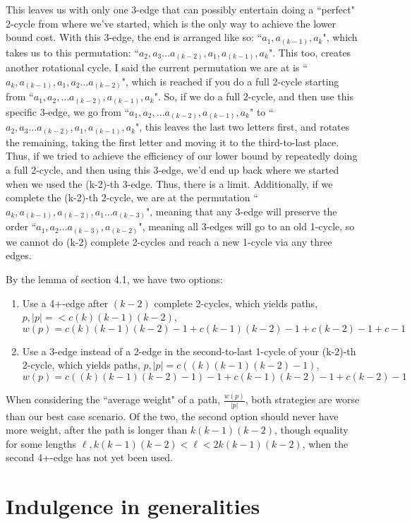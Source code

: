 \documentclass{article}
\newcommand{\edit}[1]{}%
\begin{document}
{This leaves us with only one 3-edge that can possibly entertain doing a ``perfect" 2-cycle from where we've started, which is the only way to achieve the lower bound cost. With this 3-edge, the end is arranged like so: ``$a_1,a_{(k-1)},a_k$", which takes us to this permutation: ``$a_2,a_3\dots a_{(k-2)},a_1,a_{(k-1)},a_k$". This too, creates another rotational cycle. I said the current permutation we are at is ``$a_k,a_{(k-1)},a_1, a_2 \dots  a_{(k-2)}$", which is reached if you do a full 2-cycle starting from ``$a_1,a_2,\dots  a_{(k-2)},a_{(k-1)},a_k$". So, if we do a full 2-cycle, and then use this specific 3-edge, we go from ``$a_1,a_2,\dots  a_{(k-2)},a_{(k-1)},a_k$" to ``$a_2,a_3\dots a_{(k-2)},a_1,a_{(k-1)},a_k$", this leaves the last two letters first, and rotates the remaining, taking the first letter and moving it to the third-to-last place. Thus, if we tried to achieve the efficiency of our lower bound by repeatedly doing a full 2-cycle, and then using this 3-edge, we'd end up back where we started when we used the (k-2)-th 3-edge. Thus, there is a limit. Additionally, if we complete the (k-2)-th 2-cycle, we are at the permutation ``$a_k,a_{(k-1)},a_{(k-2)},a_1\dots  a_{(k-3)}$", meaning that any 3-edge will preserve the order ``$a_1,a_2\dots  a_{(k-3)},a_{(k-2)}$", meaning all 3-edges will go to an old 1-cycle, so we cannot do (k-2) complete 2-cycles and reach a new 1-cycle via any three edges.

By the lemma of section 4.1, we have two options:\edit{ we will actually establish multiple lemmas}

\begin{enumerate}
    \item Use a 4+-edge after $(k-2)$ complete 2-cycles, which yields paths, $p, |p| =< c(k)(k-1)(k-2)$, $w(p) = c(k)(k-1)(k-2)-1 + c(k-1)(k-2)-1 + c(k-2)-1 + c-1$
    \item Use a 3-edge instead of a 2-edge in the second-to-last 1-cycle of your (k-2)-th 2-cycle, which yields paths, $p, |p| = c((k)(k-1)(k-2)-1)$, $w(p) = c((k)(k-1)(k-2)-1)-1 + c(k-1)(k-2)-1 + c(k-2)-1$
\end{enumerate}
When considering the ``average weight" of a path, $\frac{w(p)}{|p|}$, both strategies are worse than our best case scenario. Of the two, the second option should never have more weight, after the path is longer than $k(k-1)(k-2)$, though equality for some lengths $\ell, k(k-1)(k-2) < \ell < 2k(k-1)(k-2)$, when the second 4+-edge has not yet been used.


\section{Indulgence in generalities} \label{formality}

}
\end{document}
